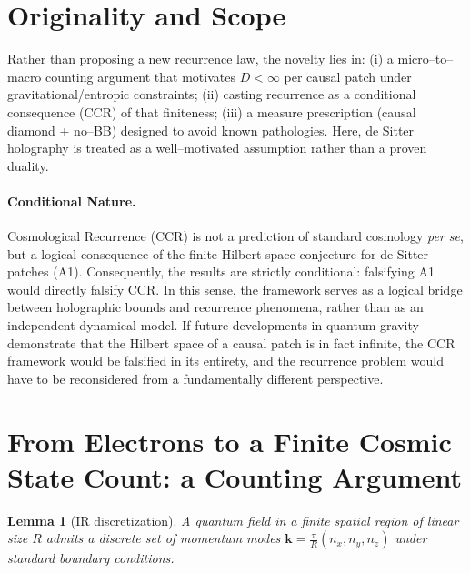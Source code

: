 \documentclass[12pt]{article}
\newtheorem{lemma}{Lemma}
\theoremstyle{remark}
\begin{document}
\section*{Originality and Scope}

Rather than proposing a new recurrence law, the novelty lies in:
(i) a micro–to–macro counting argument that motivates $D < \infty$ per causal patch under
gravitational/entropic constraints;
(ii) casting recurrence as a conditional consequence (CCR) of that finiteness;
(iii) a measure prescription (causal diamond + no–BB) designed to avoid known pathologies.
Here, de Sitter holography is treated as a well–motivated assumption rather than a proven duality.

\begin{center}
\end{center}


\paragraph{Conditional Nature.} 
Cosmological Recurrence (CCR) is not a prediction of standard cosmology \emph{per se}, but a logical consequence of the finite Hilbert space conjecture for de Sitter patches (A1). Consequently, the results are strictly conditional: falsifying A1 would directly falsify CCR. In this sense, the framework serves as a logical bridge between holographic bounds and recurrence phenomena, rather than as an independent dynamical model. If future developments in quantum gravity demonstrate that the Hilbert space of a causal patch is in fact infinite, the CCR framework would be falsified in its entirety, and the recurrence problem would have to be reconsidered from a fundamentally different perspective.

\section{From Electrons to a Finite Cosmic State Count: a Counting Argument}
\begin{lemma}[IR discretization]\label{lem:IR}
A quantum field in a finite spatial region of linear size $R$ admits a discrete set of momentum modes
$\mathbf{k}=\frac{\pi}{R}(n_x,n_y,n_z)$ under standard boundary conditions.
\end{lemma}
\end{document}
